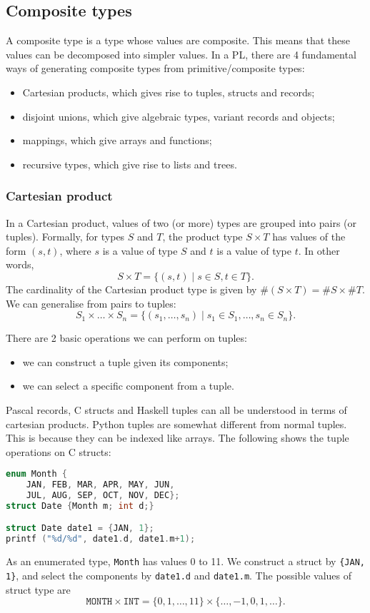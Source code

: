 \documentclass[a4paper, openany]{memoir}
\begin{document}
\subsection{Composite types}
A composite type is a type whose values are composite. This means that these values can be decomposed into simpler values. In a PL, there are 4 fundamental ways of generating composite types from primitive/composite types:
\begin{itemize}
    \item Cartesian products, which gives rise to tuples, structs and records;
    \item disjoint unions, which give algebraic types, variant records and objects;
    \item mappings, which give arrays and functions;
    \item recursive types, which give rise to lists and trees.
\end{itemize}

\subsubsection{Cartesian product}
In a Cartesian product, values of two (or more) types are grouped into pairs (or tuples). Formally, for types $S$ and $T$, the product type $S \times T$ has values of the form $(s, t)$, where $s$ is a value of type $S$ and $t$ is a value of type $t$. In other words,
\[S \times T = \{(s, t) \mid s \in S, t \in T\}.\]
The cardinality of the Cartesian product type is given by $\#(S \times T) = \#S \times \#T$. We can generalise from pairs to tuples:
\[S_1 \times \dots \times S_n = \{(s_1, \dots, s_n) \mid s_1 \in S_1, \dots, s_n \in S_n\}.\]

There are 2 basic operations we can perform on tuples:
\begin{itemize}
    \item we can construct a tuple given its components;
    \item we can select a specific component from a tuple.
\end{itemize}

Pascal records, C structs and Haskell tuples can all be understood in terms of cartesian products. Python tuples are somewhat different from normal tuples. This is because they can be indexed like arrays. The following shows the tuple operations on C structs:
\begin{lstlisting}[language=c]
enum Month {
    JAN, FEB, MAR, APR, MAY, JUN,
    JUL, AUG, SEP, OCT, NOV, DEC};
struct Date {Month m; int d;}

struct Date date1 = {JAN, 1};
printf ("%d/%d", date1.d, date1.m+1);
\end{lstlisting}
As an enumerated type, \texttt{Month} has values 0 to 11. We construct a struct by \texttt{\{JAN, 1\}}, and select the components by \texttt{date1.d} and \texttt{date1.m}. The possible values of struct type are 
\[\texttt{MONTH} \times \texttt{INT} = \{0, 1, \dots, 11\} \times \{\dots, -1, 0, 1, \dots\}.\]
\end{document}
